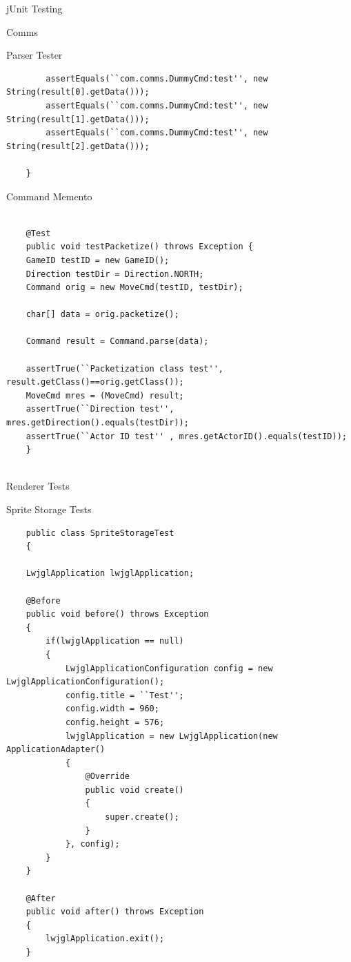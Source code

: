 \documentclass[12pt]{report}
\begin{document}
\begin{chapter}{jUnit Testing}
\begin{section}{Comms}
\begin{subsection}{Parser Tester}
\begin{lstlisting}
        assertEquals(``com.comms.DummyCmd:test'', new String(result[0].getData()));
        assertEquals(``com.comms.DummyCmd:test'', new String(result[1].getData()));
        assertEquals(``com.comms.DummyCmd:test'', new String(result[2].getData()));

    }

 \end{lstlisting}
  \end{subsection}

  \begin{subsection}{Command Memento}
   \begin{lstlisting}
    
    @Test
    public void testPacketize() throws Exception {
    GameID testID = new GameID();
    Direction testDir = Direction.NORTH;
    Command orig = new MoveCmd(testID, testDir);

    char[] data = orig.packetize();

    Command result = Command.parse(data);

    assertTrue(``Packetization class test'', result.getClass()==orig.getClass());
    MoveCmd mres = (MoveCmd) result;
    assertTrue(``Direction test'', mres.getDirection().equals(testDir));
    assertTrue(``Actor ID test'' , mres.getActorID().equals(testID));
    }


    \end{lstlisting}
   \end{subsection}
  \end{section}

  \begin{section}{Renderer Tests}
   \begin{subsection}{Sprite Storage Tests}
    \begin{lstlisting}
    public class SpriteStorageTest
    {

    LwjglApplication lwjglApplication;

    @Before
    public void before() throws Exception
    {
        if(lwjglApplication == null)
        {
            LwjglApplicationConfiguration config = new LwjglApplicationConfiguration();
            config.title = ``Test'';
            config.width = 960;
            config.height = 576;
            lwjglApplication = new LwjglApplication(new ApplicationAdapter()
            {
                @Override
                public void create()
                {
                    super.create();
                }
            }, config);
        }
    }
    
    @After
    public void after() throws Exception
    {
        lwjglApplication.exit();
    }


\end{lstlisting}
\end{subsection}
\end{section}
\end{chapter}
\end{document}
